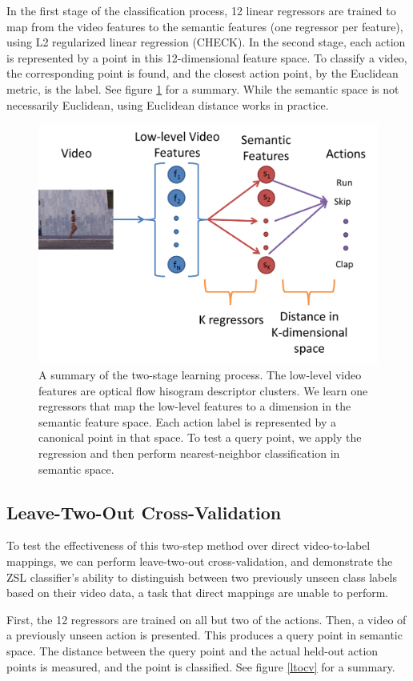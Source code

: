 \documentclass{article}
\begin{document}
In the first stage of the classification process, 12 linear regressors are trained to map from the video features to the semantic features (one regressor per feature), using L2 regularized linear regression (CHECK). In the second stage, each action is represented by a point in this 12-dimensional feature space. To classify a video, the corresponding point is found, and the closest action point, by the Euclidean metric, is the label. See figure \ref{2stage} for a summary. While the semantic space is not necessarily Euclidean, using Euclidean distance works in practice.

\begin{figure}[h]
  \centering
  \includegraphics[width=.5\linewidth]{2stagelearning.png}
  \caption{A summary of the two-stage learning process. The low-level video features are optical flow hisogram descriptor clusters. We learn one regressors that map the low-level features to a dimension in the semantic feature space. Each action label is represented by a canonical point in that space.  To test a query point, we apply the regression and then perform nearest-neighbor classification in semantic space.}
  \label{2stage}
\end{figure}

\subsection{Leave-Two-Out Cross-Validation}
To test the effectiveness of this two-step method over direct video-to-label mappings, we can perform leave-two-out cross-validation, and demonstrate the ZSL classifier’s ability to distinguish between two previously unseen class labels based on their video data, a task that direct mappings are unable to perform.

First, the 12 regressors are trained on all but two of the actions. Then, a video of a previously unseen action is presented. This produces a query point in semantic space. The distance between the query point and the actual held-out action points is measured, and the point is classified. See figure \ref{ltocv} for a summary.
\end{document}
